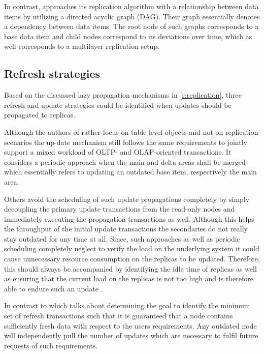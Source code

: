 In contrast, \cite{xiang:2008} approaches its replication algorithm with a relationship between data items by utilizing a directed acyclic graph (DAG).
Their graph essentially denotes a dependency between data items. The root node of such graphs corresponds to a base data item and child nodes correspond 
to its deviations over time, which as well corresponds to a multilayer replication setup.





\subsection{Refresh strategies}
\label{r:strategies}
Based on the discussed lazy propagation mechanisms in \ref{r:replication}, three refresh and update strategies could be identified when updates should be propagated 
to replicas.

Although the authors of \cite{psaroudakis:2015} rather focus on table-level objects and not on replication scenarios the up-date mechanism 
still follows the same requirements to jointly support a mixed workload of OLTP- and OLAP-oriented transactions.
It considers a periodic approach when the main and delta areas shall be merged which essentially refers to updating an outdated base item, respectively the main area.

Others \cite{rohm:2002} avoid the scheduling of such update propagations completely by simply decoupling the primary update transactions from the read-only nodes
and immediately executing the propagation-transactions as well. Although this helps the throughput of the initial update transactions the secondaries do not really 
stay outdated for any time at all. Since, such approaches as well as periodic scheduling completely neglect to verify the load on the underlying system it could 
cause unnecessary resource consumption on the replicas to be updated. Therefore, this should always be accompanied by identifying the idle time of replicas as well 
as ensuring that the current load on the replicas is not too high and is therefore able to endure such an update \cite{voicu:2010}.

In contrast to \cite{peralta:2006} which talks about determining the goal to identify the minimum set of refresh transactions such that it is guaranteed that a node contains 
sufficiently fresh data with respect to the users requirements. Any outdated node will independently pull the number of updates which are necessary to fulfil future requests 
of such requirements.

